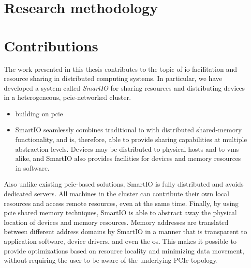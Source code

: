 \section{Research methodology}

\section{Contributions}
The work presented in this thesis contributes to the topic of \gls{io} facilitation and resource sharing in distributed computing systems.
%
In particular, we have developed a system called \emph{SmartIO} for sharing resources and distributing devices in a heterogeneous, \gls{pcie}-networked cluster.
%
\begin{itemize}
	\item building on pcie

	\item SmartIO seamlessly combines traditional \gls{io} with distributed shared-memory functionality, and is, therefore, able to provide sharing capabilities at multiple abstraction levels.
		Devices may be distributed to physical hosts and to \glspl{vm} alike, and SmartIO also provides facilities for  devices and memory resources in software.
\end{itemize}


%
Also unlike existing \gls{pcie}-based solutions, SmartIO is fully distributed and avoids dedicated servers.
All machines in the cluster can contribute their own local resources and access remote resources, even at the same time.
%
Finally, by using \gls{pcie} shared memory techniques, SmartIO is able to abstract away the physical location of devices and memory resources. 
Memory addresses are translated between different address domains by SmartIO in a manner that is transparent to application software, device drivers, and even the \gls{os}.
This makes it possible to provide optimizations based on resource locality and minimizing data movement, without requiring the user to be aware of the underlying PCIe topology.
%

